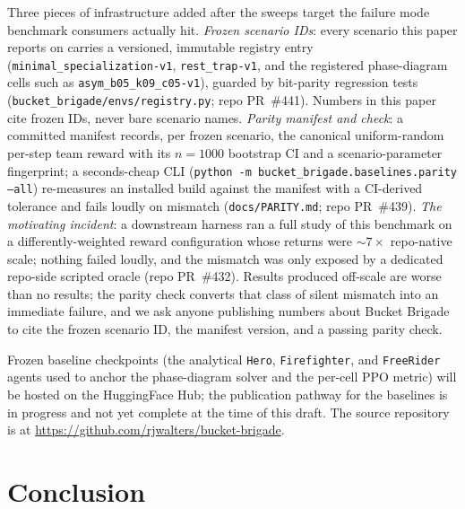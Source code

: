 \documentclass{anvil-paper}
\begin{document}
Three pieces of infrastructure added after the sweeps target the failure
mode benchmark consumers actually hit. \emph{Frozen scenario IDs}: every
scenario this paper reports on carries a versioned, immutable registry
entry (\texttt{minimal\_specialization-v1}, \texttt{rest\_trap-v1}, and
the registered phase-diagram cells such as
\texttt{asym\_b05\_k09\_c05-v1}), guarded by bit-parity regression tests
(\texttt{bucket\_brigade/envs/registry.py}; repo PR~\#441). Numbers in
this paper cite frozen IDs, never bare scenario names. \emph{Parity
manifest and check}: a committed manifest records, per frozen scenario,
the canonical uniform-random per-step team reward with its $n{=}1000$
bootstrap CI and a scenario-parameter fingerprint; a seconds-cheap CLI
(\texttt{python -m bucket\_brigade.baselines.parity --all}) re-measures
an installed build against the manifest with a CI-derived tolerance and
fails loudly on mismatch (\texttt{docs/PARITY.md}; repo PR~\#439).
\emph{The motivating incident}: a downstream harness ran a full study of
this benchmark on a differently-weighted reward configuration whose
returns were ${\sim}7{\times}$ repo-native scale; nothing failed loudly,
and the mismatch was only exposed by a dedicated repo-side scripted
oracle (repo PR~\#432). Results produced off-scale are worse than no
results; the parity check converts that class of silent mismatch into an
immediate failure, and we ask anyone publishing numbers about Bucket
Brigade to cite the frozen scenario ID, the manifest version, and a
passing parity check.

Frozen baseline checkpoints (the analytical \texttt{Hero},
\texttt{Firefighter}, and \texttt{FreeRider} agents used to anchor the
phase-diagram solver and the per-cell PPO metric) will be hosted on the
HuggingFace Hub; the publication pathway for the baselines is in progress
and not yet complete at the time of this draft. The source repository is at
\url{https://github.com/rjwalters/bucket-brigade}.

\section*{Conclusion}
\end{document}
